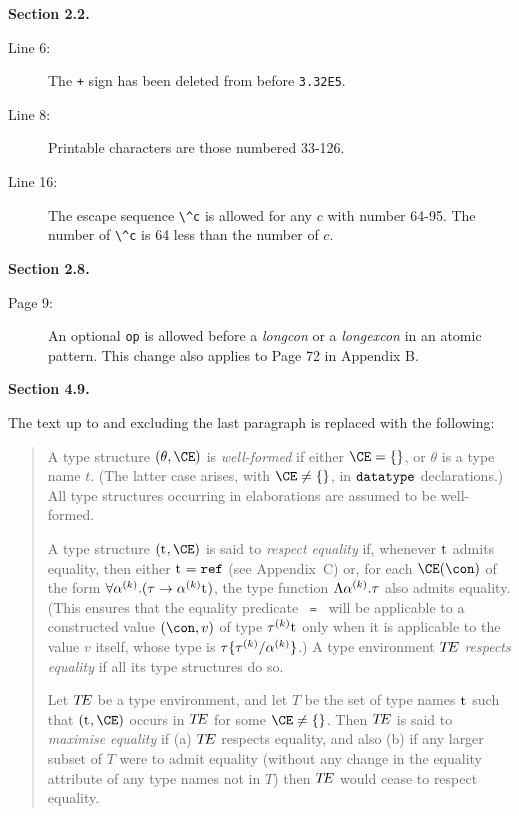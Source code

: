 {\samepage
\noindent
{\bf Section 2.2.}

\begin{description}
\item[Line 6:] The {\tt +} sign has been deleted from before {\tt 3.32E5}.
\item[Line 8:] Printable characters are those numbered 33-126.
\item[Line 16:]
The escape sequence \verb+\^c+ is allowed for any $c$ with number 64-95.
The number of \verb+\^c+ is 64 less than the number of $c$.
\end{description}
\bigskip

}
{\samepage
\noindent
{\bf Section 2.8.}

\begin{description}
\item[Page 9:] An optional {\tt op} is allowed before a {\it longcon}
or a {\it longexcon} in an atomic pattern. This change also applies to
Page 72 in Appendix B.
\end{description}
\bigskip

}
\newpage
{\samepage
\noindent
{\bf Section 4.9.}
\medskip

\noindent
The text up to and excluding the last paragraph is replaced with the following:

}
\begin{quotation}
\noindent
A type structure $(\theta,\CE)$ is {\sl well-formed} if either
$\CE=\emptymap$, or $\theta$ is a type name $t$.
(The latter case arises, with $\CE\neq\emptymap$, in ${\tt datatype}$
declarations.)
All type structures occurring in elaborations are assumed to
be well-formed.

A type structure $(\t,\CE)$ is said to
{\sl respect equality} if, whenever ${\rm t}^{{}}$ admits equality, then
either ${\rm t}^{{}}=\mbox{\tt ref}$ (see Appendix~C) or,
for each $\CE(\con)$ of the form
$\forall\alpha^{(k)}.(\tau\rightarrow\alpha^{(k)}{\rm t}^{{}})$,
the type function $\Lambda\alpha^{(k)}.\tau$ also admits equality.
(This ensures that the equality
predicate ~{\tt =}~ will be applicable to a constructed value $(\con,v)$ of
type $\tau^{(k)}{\rm t}^{{}}$ only when it is applicable to the value $v$ itself,
whose type is $\tau\{\tau^{(k)}/\alpha^{(k)}\}$.)
A type environment $\mbox{$T\!E$}$ {\sl respects equality} if all its type
structures do so.

Let $\mbox{$T\!E$}$ be a type environment, and let $T$ be the set of type names
${\rm t}^{{}}$ such that $(\t,\CE)$ occurs in $\mbox{$T\!E$}$ for some
$\CE\neq\emptymap$.  Then $\mbox{$T\!E$}$ is said to {\sl maximise equality}
if (a) $\mbox{$T\!E$}$ respects equality, and also (b) if any larger subset of
$T$ were to admit equality (without any change in the equality
attribute of any type names not in $T$) then $\mbox{$T\!E$}$ would cease to
respect equality.
\end{quotation}
\medskip

